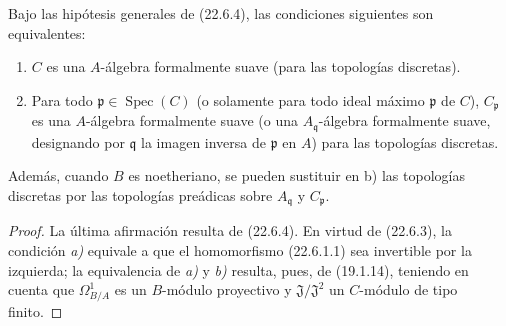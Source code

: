 \begin{corollary}[22.6.6]
\label{0.22.6.6-fr}
Bajo las hipótesis generales de \textup{(22.6.4)}, las condiciones siguientes son
equivalentes:
\begin{enumerate}
  \item[\textup{a)}] $C$ es una $A$-álgebra formalmente suave (para las topologías
  discretas).
  \item[\textup{b)}] Para todo $\mathfrak p\in\operatorname{Spec}(C)$ \textup{(o solamente para todo ideal}
  máximo \textup{$\mathfrak p$ de $C$)}, $C_{\mathfrak p}$ es una $A$-álgebra
  formalmente suave \textup{(o una $A_{\mathfrak q}$-álgebra formalmente suave, designando
  por $\mathfrak q$ la imagen inversa de $\mathfrak p$ en $A$)}
  para las topologías discretas.
\end{enumerate}
Además, cuando $B$ es noetheriano, se pueden sustituir en \textup{b)} las topologías
discretas por las topologías preádicas sobre $A_{\mathfrak q}$ y
$C_{\mathfrak p}$.
\end{corollary}

\begin{proof}
La última afirmación resulta de (22.6.4). En virtud de (22.6.3), la condición
\emph{a)} equivale a que el homomorfismo (22.6.1.1) sea invertible por la izquierda;
la equivalencia de \emph{a)} y \emph{b)} resulta, pues, de (19.1.14), teniendo en cuenta que
$\Omega^1_{B/A}$ es un $B$-módulo proyectivo y $\mathfrak J/\mathfrak J^2$
un $C$-módulo de tipo finito.
\end{proof}

